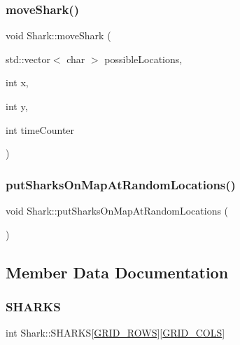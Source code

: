 \mbox{\label{class_shark_ae969adad351a5e31853208003e186eb4}} 
\subsubsection{\texorpdfstring{move\+Shark()}{moveShark()}}
{\footnotesize\ttfamily void Shark\+::move\+Shark (\begin{DoxyParamCaption}\item[{std\+::vector$<$ char $>$}]{possible\+Locations,  }\item[{int}]{x,  }\item[{int}]{y,  }\item[{int}]{time\+Counter }\end{DoxyParamCaption})}

\mbox{\label{class_shark_a45627e4700fc05d5a9e54283a76348f8}} 
\subsubsection{\texorpdfstring{put\+Sharks\+On\+Map\+At\+Random\+Locations()}{putSharksOnMapAtRandomLocations()}}
{\footnotesize\ttfamily void Shark\+::put\+Sharks\+On\+Map\+At\+Random\+Locations (\begin{DoxyParamCaption}{ }\end{DoxyParamCaption})}



\subsection{Member Data Documentation}
\mbox{\label{class_shark_a21ce8940cbf1ded5529002c42dd01595}} 
\subsubsection{\texorpdfstring{S\+H\+A\+R\+KS}{SHARKS}}
{\footnotesize\ttfamily int Shark\+::\+S\+H\+A\+R\+KS\mbox{[}\mbox{\hyperlink{_config_8h_a5ba0b105774bfdc09ce545d73dcdedd3}{G\+R\+I\+D\+\_\+\+R\+O\+WS}}\mbox{]}\mbox{[}\mbox{\hyperlink{_config_8h_a881e2cda79b5951641b07f678f6ef929}{G\+R\+I\+D\+\_\+\+C\+O\+LS}}\mbox{]}}

